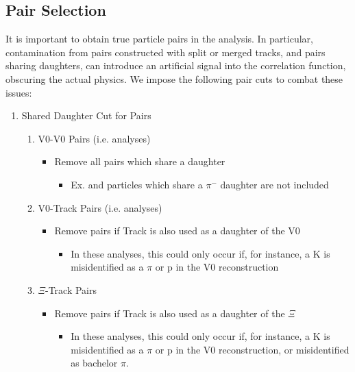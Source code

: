 \documentclass[../AnalysisNoteJBuxton.tex]{subfiles}
\begin{document}
\subsection{Pair Selection}
\label{PairSelection}

It is important to obtain true particle pairs in the analysis.  In particular, contamination from pairs constructed with split or merged tracks, and pairs sharing daughters, can introduce an artificial signal into the correlation function, obscuring the actual physics.  We impose the following pair cuts to combat these issues:

\begin{enumerate}
 \item Shared Daughter Cut for Pairs
 \begin{enumerate}
  \item V0-V0 Pairs (i.e. \LamKs analyses)
  \begin{itemize}
   \item Remove all pairs which share a daughter 
   \begin{itemize}
    \item Ex. \Lam and \Ks particles which share a $\pi^{-}$ daughter are not included
   \end{itemize} 
  \end{itemize}
  \item V0-Track Pairs (i.e. \LamKpm analyses)
  \begin{itemize}
   \item Remove pairs if Track is also used as a daughter of the V0
   \begin{itemize}
    \item In these analyses, this could only occur if, for instance, a K is misidentified as a $\pi$ or p in the V0 reconstruction
   \end{itemize}
  \end{itemize}
  \item $\Xi$-Track Pairs
  \begin{itemize}
   \item Remove pairs if Track is also used as a daughter of the $\Xi$
   \begin{itemize}
    \item In these analyses, this could only occur if, for instance, a K is misidentified as a $\pi$ or p in the V0 reconstruction, or misidentified as bachelor $\pi$.
   \end{itemize}
  \end{itemize}  
 \end{enumerate}

\end{enumerate}
\end{document}
